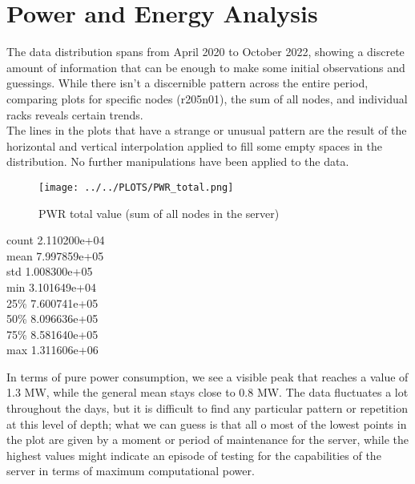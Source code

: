 \section{Power and Energy Analysis}
\noindent
The data distribution spans from April 2020 to October 2022, showing a discrete amount of information that can be enough to make some initial observations and guessings. While there isn't a discernible pattern across the entire period, comparing plots for specific nodes (r205n01), the sum of all nodes, and individual racks reveals certain trends. \\
The lines in the plots that have a strange or unusual pattern are the result of the horizontal and vertical interpolation applied to fill some empty spaces in the distribution. No further manipulations have been applied to the data.

\vspace{-15pt}

\begin{figure}[H]
\centering
\texttt{[image: ../../PLOTS/PWR\_total.png]}
\captionsetup{skip=-10pt}
\caption{PWR total value (sum of all nodes in the server)}
\label{fig:PWR_total}
\end{figure}

\begin{center}
count    2.110200e+04 \\
mean     7.997859e+05 \\
std      1.008300e+05 \\
min      3.101649e+04 \\
25\%      7.600741e+05 \\
50\%      8.096636e+05 \\
75\%      8.581640e+05 \\
max      1.311606e+06
\end{center}

\noindent
In terms of pure power consumption, we see a visible peak that reaches a value of 1.3 MW, while the general mean stays close to 0.8 MW. The data fluctuates a lot throughout the days, but it is difficult to find any particular pattern or repetition at this level of depth; what we can guess is that all o most of the lowest points in the plot are given by a moment or period of maintenance for the server, while the highest values might indicate an episode of testing for the capabilities of the server in terms of maximum computational power.

\vspace{-15pt}

